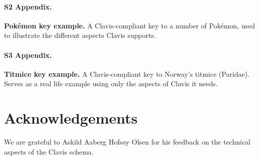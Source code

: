 \documentclass[10pt,letterpaper]{article}
\begin{document}
\paragraph*{S2 Appendix.}
\label{S2_Appendix}
{\bf Pokémon key example.} A Clavis-compliant key to a number of Pokémon, used to illustrate the different aspects Clavis supports.

\paragraph*{S3 Appendix.}
\label{S3_Appendix}
{\bf Titmice key example.} A Clavis-compliant key to Norway's titmice (Paridae). Serves as a real life example using only the aspects of Clavis it needs.

\section*{
Acknowledgements
}
We are grateful to Askild Aaberg Hofsøy Olsen for his feedback on the technical aspects of the Clavis schema. 
\nolinenumbers

\end{document}
